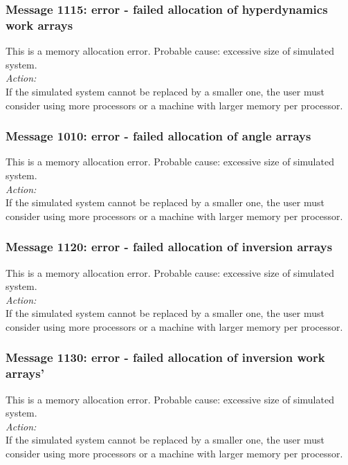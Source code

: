 \subsubsection*{Message 1115: error - failed allocation of hyperdynamics
work arrays}

This is a memory allocation error. Probable cause: excessive size of
simulated system. \\

\noindent
{\em Action:}\\
If the simulated system cannot be replaced by a smaller one, the user
must consider using more processors or a machine with larger memory
per processor.

\subsubsection*{Message 1010: error - failed allocation of angle
arrays}

This is a memory allocation error. Probable cause: excessive size of
simulated system. \\

\noindent
{\em Action:}\\
If the simulated system cannot be replaced by a smaller one, the user
must consider using more processors or a machine with larger memory
per processor.

\subsubsection*{Message 1120: error - failed allocation of inversion
arrays}

This is a memory allocation error. Probable cause: excessive size of
simulated system. \\

\noindent
{\em Action:}\\
If the simulated system cannot be replaced by a smaller one, the user
must consider using more processors or a machine with larger memory
per processor.

\subsubsection*{Message 1130: error - failed allocation of inversion
work arrays'}

This is a memory allocation error. Probable cause: excessive size of
simulated system. \\

\noindent
{\em Action:}\\
If the simulated system cannot be replaced by a smaller one, the user
must consider using more processors or a machine with larger memory
per processor.

